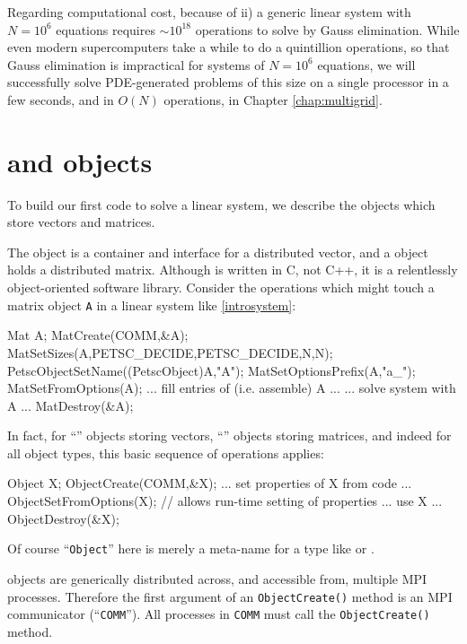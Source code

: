 Regarding computational cost, because of ii) a generic linear system with $N=10^6$ equations requires $\sim 10^{18}$ operations to solve by Gauss elimination.  While even modern supercomputers take a while to do a quintillion operations, so that Gauss elimination is impractical for systems of $N=10^6$ equations, we will successfully solve PDE-generated problems of this size on a single processor in a few seconds, and in $O(N)$ operations, in Chapter \ref{chap:multigrid}.


\section{\PETSc \pVec and \pMat objects}

To build our first \PETSc code to solve a linear system, we describe the \PETSc objects which store vectors and matrices.

The \pVec object is a container and interface for a distributed vector, and a \pMat object holds a distributed matrix.  Although \PETSc is written in C, not C++, it is a relentlessly object-oriented software library.  Consider the operations which might touch a matrix object \texttt{A} in a linear system like \eqref{introsystem}:
\begin{code}
Mat A;
MatCreate(COMM,&A);
MatSetSizes(A,PETSC_DECIDE,PETSC_DECIDE,N,N);
PetscObjectSetName((PetscObject)A,"A");
MatSetOptionsPrefix(A,"a_");
MatSetFromOptions(A);
... fill entries of (i.e. assemble) A ...
... solve system with A ...
MatDestroy(&A);
\end{code}
In fact, for ``\pVec'' objects storing vectors, ``\pMat'' objects storing matrices, and indeed for all \PETSc object types, this basic sequence of operations applies:
\begin{code}
Object X;
ObjectCreate(COMM,&X);
... set properties of X from code ...
ObjectSetFromOptions(X);  // allows run-time setting of properties
... use X ...
ObjectDestroy(&X);
\end{code}
Of course ``\texttt{Object}'' here is merely a meta-name for a \PETSc type like \pVec or \pMat.

\PETSc objects are generically distributed across, and accessible from, multiple MPI processes.  Therefore the first argument of an \texttt{ObjectCreate()} method is an MPI communicator (``\texttt{COMM}'').  All processes in \texttt{COMM} must call the \texttt{ObjectCreate()} method.


